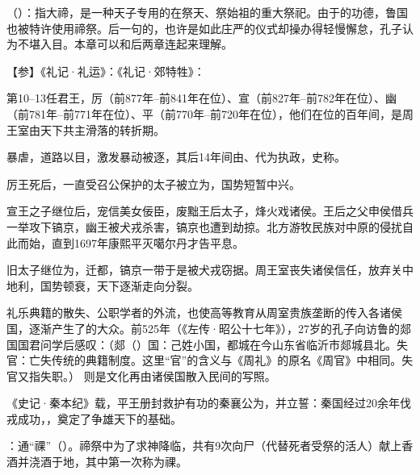 {
\item {}（）：指大禘，是一种天子专用的在祭天、祭始祖的重大祭祀。由于的功德，鲁国也被特许使用禘祭。后一句的，也许是如此庄严的仪式却操办得轻慢懈怠，孔子认为不堪入目。本章可以和后两章连起来理解。

【参】《礼记·礼运》：《礼记·郊特牲》： %

第10--13任君王，厉（前877年--前841年在位）、宣（前827年--前782年在位）、幽（前781年--前771年在位）、平（前770年--前720年在位），他们在位的百年间，是周王室由天下共主滑落的转折期。
\begin{lyenumerate}
\item {}暴虐，道路以目，激发暴动被逐，其后14年间由、代为执政，史称。
\item 厉王死后，一直受召公保护的太子被立为，国势短暂中兴。
\item {}宣王之子继位后，宠信美女佞臣，废黜王后太子，烽火戏诸侯。王后之父申侯借兵一举攻下镐京，幽王被犬戎杀害，镐京也遭到劫掠。北方游牧民族对中原的侵扰自此而始，直到1697年康熙平灭噶尔丹才告平息。
\item 旧太子继位为，迁都，镐京一带于是被犬戎窃据。周王室丧失诸侯信任，放弃关中地利，国势顿衰，天下逐渐走向分裂。

礼乐典籍的散失、公职学者的外流，也使高等教育从周室贵族垄断的传入各诸侯国，逐渐产生了的大众。前525年（《左传·昭公十七年》），27岁的孔子向访鲁的郯国国君问学后感叹：（郯（）国：己姓小国，都城在今山东省临沂市郯城县北。失官：亡失传统的典籍制度。这里“官”的含义与《周礼》的原名《周官》中相同。失官又指失职。） 则是文化再由诸侯国散入民间的写照。
\item {}《史记·秦本纪》载，平王册封救护有功的秦襄公为，并立誓：秦国经过20余年伐戎成功，，奠定了争雄天下的基础。
\end{lyenumerate}

\item {}：通“祼”（）。禘祭中为了求神降临，共有9次向尸（代替死者受祭的活人）献上香酒并浇酒于地，其中第一次称为祼。
}
{}


